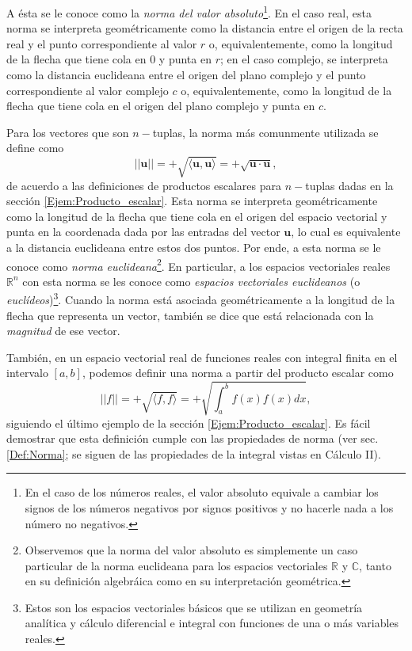 \noindent A ésta se le conoce como la \emph{norma del valor absoluto}\footnote{En el caso de los números reales, el valor absoluto equivale a cambiar los signos de los números negativos por signos positivos y no hacerle nada a los número no negativos.}. En el caso real, esta norma se interpreta geométricamente como la distancia entre el origen de la recta real y el punto correspondiente al valor $r$ o, equivalentemente, como la longitud de la flecha que tiene cola en $0$ y punta en $r$; en el caso complejo, se interpreta como la distancia euclideana entre el origen del plano complejo y el punto correspondiente al valor complejo $c$ o, equivalentemente, como la longitud de la flecha que tiene cola en el origen del plano complejo y punta en $c$. 

\vspace{3mm}

Para los vectores que son $n-$tuplas, la norma más comunmente utilizada se define como $$||\mathbf{u}|| = +\sqrt{\langle\mathbf{u},\mathbf{u}\rangle} = +\sqrt{\mathbf{u}\cdot\mathbf{u}},$$ \noindent de acuerdo a las definiciones de productos escalares para $n-$tuplas dadas en la sección \ref{Ejem:Producto_escalar}. Esta norma se interpreta geométricamente como la longitud de la flecha que tiene cola en el origen del espacio vectorial y punta en la coordenada dada por las entradas del vector $\mathbf{u}$, lo cual es equivalente a la distancia euclideana entre estos dos puntos. Por ende, a esta norma se le conoce como \emph{norma euclideana}\footnote{Observemos que la norma del valor absoluto es simplemente un caso particular de la norma euclideana para los espacios vectoriales $\mathbb{R}$ y $\mathbb{C}$, tanto en su definición algebráica como en su interpretación geométrica.}. En particular, a los espacios vectoriales reales $\mathbb{R}^n$ con esta norma se les conoce como \emph{espacios vectoriales euclideanos} (o \emph{euclídeos})\footnote{Estos son los espacios vectoriales básicos que se utilizan en geometría analítica y cálculo diferencial e integral con funciones de una o más variables reales.}. Cuando la norma está asociada geométricamente a la longitud de la flecha que representa un vector, también se dice que está relacionada con la \emph{magnitud} de ese vector.

\vspace{3mm}

También, en un espacio vectorial real de funciones reales con integral finita en el intervalo $[a,b]$, podemos definir una norma a partir del producto escalar como $$||f|| = +\sqrt{\langle f,f\rangle} = +\sqrt{\int_a^b f(x)f(x) dx},$$ \noindent siguiendo el último ejemplo de la sección \ref{Ejem:Producto_escalar}. Es fácil demostrar que esta definición cumple con las propiedades de norma (ver sec. \ref{Def:Norma}; se siguen de las propiedades de la integral vistas en Cálculo II). 

